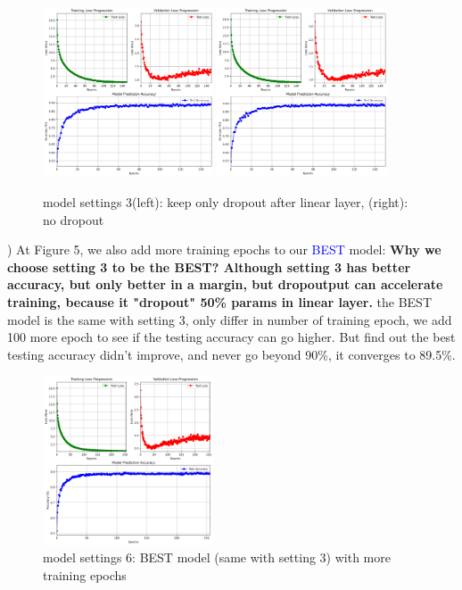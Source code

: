 \documentclass{article}
\begin{document}
\begin{figure}[hbtp]
  \centering
  \includegraphics[width=0.45\textwidth]{fig/train_result_3.png} %
  \includegraphics[width=0.45\textwidth]{fig/train_result_4.png} %
  \caption{model settings 3(left): keep only dropout after linear layer, (right): no dropout} %
  \label{fig:curve} %
\end{figure}

) At Figure 5, we also add more training epochs to our \textcolor{blue}{BEST} model: \textbf{Why we choose setting 3 to be the BEST? Although setting 3 has better accuracy, but only better in a margin, but dropoutput can accelerate training, because it "dropout" 50\% params in linear layer.} the BEST model is the same with setting 3, only differ in number of training epoch, we add 100 more epoch to see if the testing accuracy can go higher. But find out the best testing accuracy didn't improve, and never go beyond 90\%, it converges to 89.5\%.\\


\begin{figure}[hbtp]
  \centering
  \includegraphics[width=0.45\textwidth]{fig/train_result_6.png} %

  \caption{model settings 6: BEST model (same with setting 3) with more training epochs} %
  \label{fig:curve} %
\end{figure}
\end{document}
